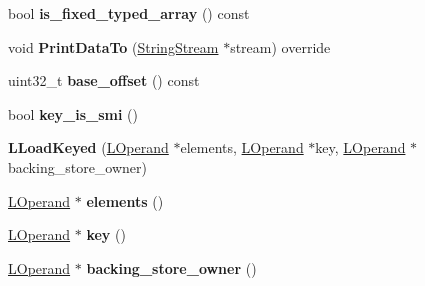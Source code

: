 \begin{DoxyCompactItemize}
\item 
bool {\bfseries is\+\_\+fixed\+\_\+typed\+\_\+array} () const \hypertarget{classv8_1_1internal_1_1_l_load_keyed_a4bfabc8b862c384fa4cf2d12bbeb40b1}{}\label{classv8_1_1internal_1_1_l_load_keyed_a4bfabc8b862c384fa4cf2d12bbeb40b1}

\item 
void {\bfseries Print\+Data\+To} (\hyperlink{classv8_1_1internal_1_1_string_stream}{String\+Stream} $\ast$stream) override\hypertarget{classv8_1_1internal_1_1_l_load_keyed_ab79d974cf88e1e1dbd886b24f0ff1984}{}\label{classv8_1_1internal_1_1_l_load_keyed_ab79d974cf88e1e1dbd886b24f0ff1984}

\item 
uint32\+\_\+t {\bfseries base\+\_\+offset} () const \hypertarget{classv8_1_1internal_1_1_l_load_keyed_a944c93975338d43236e1a696b686f4a4}{}\label{classv8_1_1internal_1_1_l_load_keyed_a944c93975338d43236e1a696b686f4a4}

\item 
bool {\bfseries key\+\_\+is\+\_\+smi} ()\hypertarget{classv8_1_1internal_1_1_l_load_keyed_a78e1238adb7d01724135d1cf0ef1b80d}{}\label{classv8_1_1internal_1_1_l_load_keyed_a78e1238adb7d01724135d1cf0ef1b80d}

\item 
{\bfseries L\+Load\+Keyed} (\hyperlink{classv8_1_1internal_1_1_l_operand}{L\+Operand} $\ast$elements, \hyperlink{classv8_1_1internal_1_1_l_operand}{L\+Operand} $\ast$key, \hyperlink{classv8_1_1internal_1_1_l_operand}{L\+Operand} $\ast$backing\+\_\+store\+\_\+owner)\hypertarget{classv8_1_1internal_1_1_l_load_keyed_ad304d9ea6496224e4a11a6cae2ee335b}{}\label{classv8_1_1internal_1_1_l_load_keyed_ad304d9ea6496224e4a11a6cae2ee335b}

\item 
\hyperlink{classv8_1_1internal_1_1_l_operand}{L\+Operand} $\ast$ {\bfseries elements} ()\hypertarget{classv8_1_1internal_1_1_l_load_keyed_a2fdaa6ebcc228ac46d2a03cffd1468ea}{}\label{classv8_1_1internal_1_1_l_load_keyed_a2fdaa6ebcc228ac46d2a03cffd1468ea}

\item 
\hyperlink{classv8_1_1internal_1_1_l_operand}{L\+Operand} $\ast$ {\bfseries key} ()\hypertarget{classv8_1_1internal_1_1_l_load_keyed_aea9caf0333cbad4a04007bd93e0fb176}{}\label{classv8_1_1internal_1_1_l_load_keyed_aea9caf0333cbad4a04007bd93e0fb176}

\item 
\hyperlink{classv8_1_1internal_1_1_l_operand}{L\+Operand} $\ast$ {\bfseries backing\+\_\+store\+\_\+owner} ()\hypertarget{classv8_1_1internal_1_1_l_load_keyed_abaa0161e1ba4f83060c3bdd5bcf52c44}{}\label{classv8_1_1internal_1_1_l_load_keyed_abaa0161e1ba4f83060c3bdd5bcf52c44}


\end{DoxyCompactItemize}
